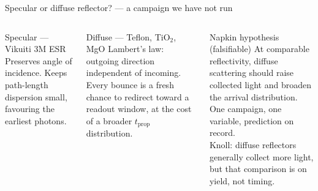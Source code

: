 \documentclass[aspectratio=169,9pt]{beamer}
\begin{document}
\begin{frame}{Specular or diffuse reflector? — a campaign we have not run}
  \begin{columns}[T]
      \begin{block}{Specular — Vikuiti 3M ESR}
        {\small Preserves angle of incidence.  Keeps path-length dispersion
        small, favouring the earliest photons.}
      \end{block}
      \begin{block}{Diffuse — Teflon, TiO$_2$, MgO}
        {\small Lambert's law: outgoing direction independent of incoming.
        Every bounce is a fresh chance to redirect toward a readout window,
        at the cost of a broader $t_{\mathrm{prop}}$ distribution.}
      \end{block}

      \begin{alertblock}{Napkin hypothesis (falsifiable)}
        {\small At comparable reflectivity, diffuse scattering should raise
        collected light and broaden the arrival distribution.
        One campaign, one variable, prediction on record.\\[4pt]
        Knoll: diffuse reflectors generally collect more light,
        but that comparison is on yield, not timing.}
      \end{alertblock}
  \end{columns}
\end{frame}
\end{document}
